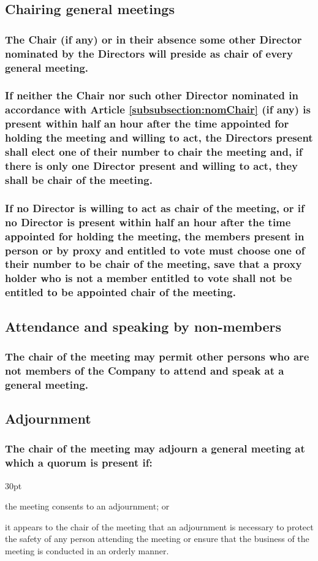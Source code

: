 \documentclass[12pt]{article}
\def\clauseindent{30pt}
\newenvironment{subindentpara}{\begin{adjustwidth}{\clauseindent}{}\begin{hanginglist}}{\end{hanginglist}\end{adjustwidth}}
\begin{document}
\subsection{Chairing general meetings}
\subsubsection{\label{subsubsection:nomChair}The Chair (if any) or in their absence some other Director nominated by the Directors will preside as chair of every general meeting.}
\subsubsection{If neither the Chair nor such other Director nominated in accordance with Article \ref{subsubsection:nomChair} (if any) is present within half an hour after the time appointed for holding the meeting and willing to act, the Directors present shall elect one of their number to chair the meeting and, if there is only one Director present and willing to act, they shall be chair of the meeting.}
\subsubsection{If no Director is willing to act as chair of the meeting, or if no Director is present within half an hour after the time appointed for holding the meeting, the members present in person or by proxy and entitled to vote must choose one of their number to be chair of the meeting, save that a proxy holder who is not a member entitled to vote shall not be entitled to be appointed chair of the meeting.}

\subsection{Attendance and speaking by non-members}
\subsubsection{The chair of the meeting may permit other persons who are not members of the Company to attend and speak at a general meeting.}

\subsection{Adjournment}
\subsubsection{The chair of the meeting may adjourn a general meeting at which a quorum is present if:}
\begin{subindentpara}
    \item the meeting consents to an adjournment; or
    \item it appears to the chair of the meeting that an adjournment is necessary to protect the safety of any person attending the meeting or ensure that the business of the meeting is conducted in an orderly manner.
\end{subindentpara}
\end{document}
